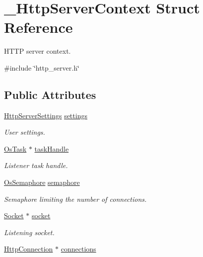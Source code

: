 \hypertarget{struct__HttpServerContext}{}\section{\+\_\+\+Http\+Server\+Context Struct Reference}
\label{struct__HttpServerContext}


H\+T\+TP server context.  




{\ttfamily \#include \char`\"{}http\+\_\+server.\+h\char`\"{}}

\subsection*{Public Attributes}
\begin{DoxyCompactItemize}
\item 
\hyperlink{structHttpServerSettings}{Http\+Server\+Settings} \hyperlink{struct__HttpServerContext_aff8572faace47a155e9e6d8564abb006}{settings}
\begin{DoxyCompactList}\small\item\em User settings. \end{DoxyCompactList}\item 
\hyperlink{structOsTask}{Os\+Task} $\ast$ \hyperlink{struct__HttpServerContext_acd0f767dde1c3f6806df984502f5fda7}{task\+Handle}
\begin{DoxyCompactList}\small\item\em Listener task handle. \end{DoxyCompactList}\item 
\hyperlink{structOsSemaphore}{Os\+Semaphore} \hyperlink{struct__HttpServerContext_abef2a2cc2c82418529cf4831e5f35fd2}{semaphore}
\begin{DoxyCompactList}\small\item\em Semaphore limiting the number of connections. \end{DoxyCompactList}\item 
\hyperlink{socket_8h_aa85acfb0fa336ef495e6ba87fb88fc48}{Socket} $\ast$ \hyperlink{struct__HttpServerContext_ad4a6bcdee7a266376683291a8e15bd8d}{socket}
\begin{DoxyCompactList}\small\item\em Listening socket. \end{DoxyCompactList}\item 
\hyperlink{http__server_8h_a3506ecffde998ab02629dca83587d2f9}{Http\+Connection} $\ast$ \hyperlink{struct__HttpServerContext_a2ca632a8ca3ae40bd4c5c4470a178c07}{connections}

\end{DoxyCompactItemize}

